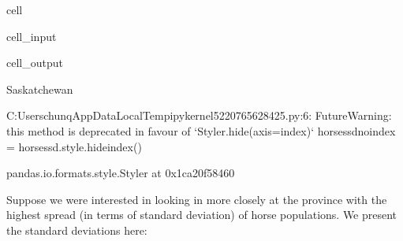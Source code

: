 \documentclass[letterpaper,10pt,english]{jupyterBook}
\begin{document}
\begin{sphinxuseclass}{cell}\begin{sphinxVerbatimInput}

\begin{sphinxuseclass}{cell_input}
\begin{sphinxVerbatim}[commandchars=\\\{\}]
  

  \PYG{p}{[}\PYG{p}{]}\PYG{p}{[}\PYG{p}{]}
 

  
 
\end{sphinxVerbatim}

\end{sphinxuseclass}\end{sphinxVerbatimInput}
\begin{sphinxVerbatimOutput}

\begin{sphinxuseclass}{cell_output}
\begin{sphinxVerbatim}[commandchars=\\\{\}]
\PYGZsq{}Saskatchewan\PYGZsq{}
\end{sphinxVerbatim}

\begin{sphinxVerbatim}[commandchars=\\\{\}]
C:\PYGZbs{}Users\PYGZbs{}chunq\PYGZbs{}AppData\PYGZbs{}Local\PYGZbs{}Temp\PYGZbs{}ipykernel\PYGZus{}5220\PYGZbs{}765628425.py:6: FutureWarning: this method is deprecated in favour of `Styler.hide(axis=\PYGZsq{}index\PYGZsq{})`
  horses\PYGZus{}sd\PYGZus{}noindex = horses\PYGZus{}sd.style.hide\PYGZus{}index()
\end{sphinxVerbatim}

\begin{sphinxVerbatim}[commandchars=\\\{\}]
\PYGZlt{}pandas.io.formats.style.Styler at 0x1ca20f58460\PYGZgt{}
\end{sphinxVerbatim}

\end{sphinxuseclass}\end{sphinxVerbatimOutput}

\end{sphinxuseclass}
\sphinxAtStartPar
Suppose we were interested in looking in more closely at the
province with the highest spread (in terms of standard deviation)
of horse populations. We present the standard deviations here:
\end{document}
